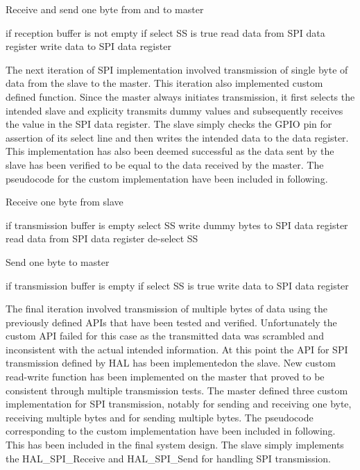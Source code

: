 \begin{algorithm}
\caption{Receive and send one byte from and to master}\label{alg:read-write-slave}
\begin{algorithmic}[1]
\State if reception buffer is not empty
\State if select SS is true
\State read data from SPI data register
\State write data to SPI data register
\end{algorithmic}
\end{algorithm}

The next iteration of SPI implementation involved transmission of single byte of data from the slave to the master. This iteration also implemented custom defined function. Since the master always initiates transmission, it first selects the intended slave and explicity transmits dummy values and subsequently receives the value in the SPI data register. The slave simply checks the GPIO pin for assertion of its select line and then writes the intended data to the data register. This implementation has also been deemed successful as the data sent by the slave has been verified to be equal to the data received by the master. The pseudocode for the custom implementation have been included in following.

\begin{algorithm}
\caption{Receive one byte from slave}\label{alg:single-byte-master}
\begin{algorithmic}[1]
\State if transmission buffer is empty
\State select SS
\State write dummy bytes to SPI data register
\State read data from SPI data register
\State de-select SS
\end{algorithmic}
\end{algorithm}

\begin{algorithm}
\caption{Send one byte to master}\label{alg:single-byte-slave}
\begin{algorithmic}[1]
\State if transmission buffer is empty
\State if select SS is true
\State write data to SPI data register
\end{algorithmic}
\end{algorithm}

The final iteration involved transmission of multiple bytes of data using the previously defined APIs that have been tested and verified. Unfortunately the custom API failed for this case as the transmitted data was scrambled and inconsistent with the actual intended information. At this point the API for SPI transmission defined by HAL has been implementedon the slave. New custom read-write function has been implemented on the master that proved to be consistent through multiple transmission tests. The master defined three custom implementation for SPI transmission, notably for sending and receiving one byte, receiving multiple bytes and for sending multiple bytes. The pseudocode corresponding to the custom implementation have been included in following. This has been included in the final system design. The slave simply implements the HAL_SPI_Receive and HAL_SPI_Send for handling SPI transmission.

